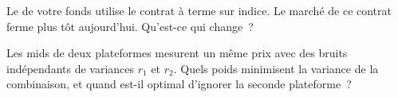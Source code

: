 \begin{interviewq}\label{iq:hf:fair-value:5}
Le  de votre fonds utilise le contrat à terme sur indice. Le marché de ce contrat ferme plus tôt aujourd'hui. Qu'est-ce qui change~?
\end{interviewq}

\begin{interviewq}\label{iq:hf:fair-value:6}
Les mids de deux plateformes mesurent un même prix avec des bruits indépendants de variances $r_1$ et $r_2$. Quels poids minimisent la variance de la combinaison,
et quand est-il optimal d'ignorer la seconde plateforme~?
\end{interviewq}
